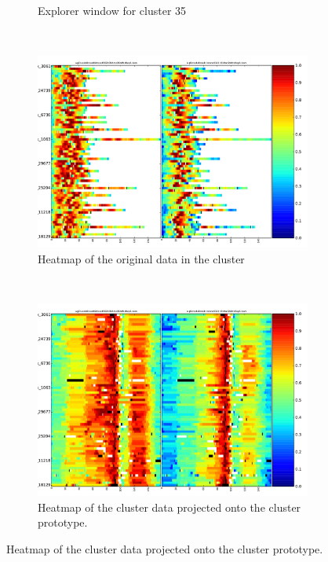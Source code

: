 \documentclass[parskip]{cs4rep}
\begin{document}
\begin{figure}
\begin{subfigure}[b]{0.45\textwidth}
        \caption{Explorer window for cluster 35}
        \label{fig:evaluation:macs-peaks:explorer}
    \end{subfigure}
    ~
    \begin{subfigure}[b]{0.45\textwidth}
        \includegraphics[width=\textwidth]{figures/evaluation/macs-peaks/dgw-cluster-35-original-heatmap.pdf}
        \caption{Heatmap of the original data in the cluster}
        \label{fig:evaluation:macs-peaks:original-heatmap}
    \end{subfigure}
    ~
    \begin{subfigure}[b]{0.45\textwidth}
        \includegraphics[width=\textwidth]{figures/evaluation/macs-peaks/dgw-cluster-35-warped-heatmap.pdf}
        \caption{Heatmap of the cluster data projected onto the cluster prototype.}
        \label{fig:evaluation:macs-peaks:warped-heatmap}

\end{subfigure}
\end{figure}
\end{document}
